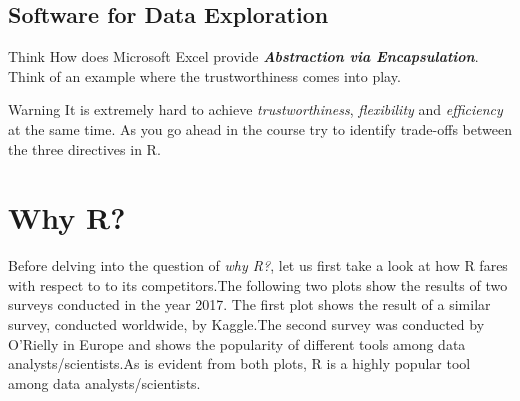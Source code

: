 \documentclass[12pt]{book}\usepackage{knitr}
\begin{document}
\subsection{Software for Data Exploration}
\begin{HIGHLIGHT}
\par{}
\end{HIGHLIGHT}

\begin{DIY}{Think}
How does Microsoft Excel provide \textbf{\emph{Abstraction via Encapsulation}}. Think of an example where the trustworthiness comes into play.
\end{DIY}

\begin{DIY}{Warning}
It is extremely hard to achieve \emph{trustworthiness}, \emph{flexibility} and \emph{efficiency} at the same time. As you go ahead in the course try to identify trade-offs between the three directives in R.  
\end{DIY}




\section{Why R?}
\noindent Before delving into the question of \emph{why R?}, let us first take a look at how R fares with respect to to its competitors.The following two plots show the results of two surveys conducted in the year 2017. The first plot shows the result of a similar survey, conducted worldwide, by Kaggle.The second survey was conducted by O'Rielly in Europe and shows the popularity of different tools among data analysts/scientists.As is evident from both plots, R is a highly popular tool among data analysts/scientists.
\end{document}
